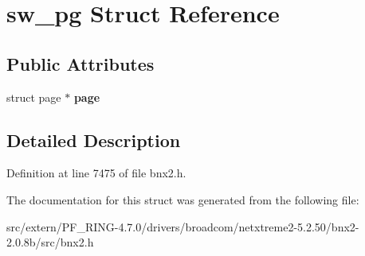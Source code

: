 \hypertarget{structsw__pg}{
\section{sw\_\-pg Struct Reference}
\label{structsw__pg}
}
\subsection*{Public Attributes}
\begin{DoxyCompactItemize}
\item 
\hypertarget{structsw__pg_a825753b3dabf10ff4542ca42b5d0fac2}{
struct page $\ast$ {\bfseries page}}
\label{structsw__pg_a825753b3dabf10ff4542ca42b5d0fac2}

\end{DoxyCompactItemize}


\subsection{Detailed Description}


Definition at line 7475 of file bnx2.h.



The documentation for this struct was generated from the following file:\begin{DoxyCompactItemize}
\item 
src/extern/PF\_\-RING-\/4.7.0/drivers/broadcom/netxtreme2-\/5.2.50/bnx2-\/2.0.8b/src/bnx2.h\end{DoxyCompactItemize}

